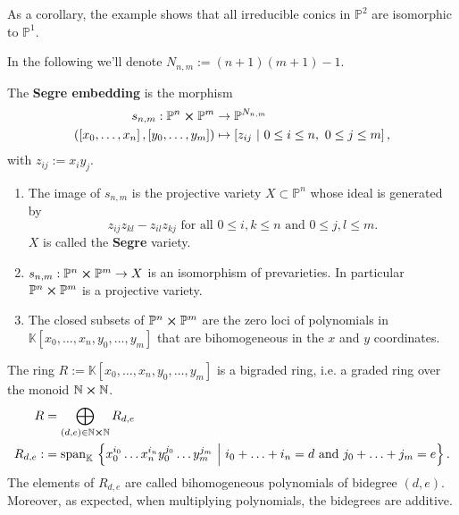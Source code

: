 \begin{rem}
	As a corollary, the example shows that all irreducible conics in $\mathbb{P}^{2}$ are isomorphic to $\mathbb{P}^{1}$.
\end{rem}

In the following we'll denote $N_{n,m} := \left( n + 1 \right) \left( m+1 \right) - 1$.
\begin{defn}
	The \textbf{Segre embedding} is the morphism
	\begin{align}
		s_{n,m}: \mathbb{P}^{n} \cross \mathbb{P}^{m} &\to \mathbb{P}^{N_{n,m}} \\
		\left( \left[ x_0 , \ldots , x_n \right], \left[ y_0 , \ldots , y_m \right] \right) &\mapsto 
		\left[ z_{ij} \ \middle|\ 0 \leq i \leq n,\ 0 \leq j \leq m \right]
	,\end{align} 
	with $z_{ij} := x_iy_j$.
\end{defn}

\begin{lem}\leavevmode\vspace{-.2\baselineskip}
	\begin{enumerate}
		\item The image of $s_{n,m}$ is the projective variety $X \subset \mathbb{P}^{n}$ whose
	ideal is generated by
	\begin{equation}
	z_{ij} z_{kl} - z_{il} z_{kj} \text{ for all } 0 \leq i,k \leq n \text{ and } 0 \leq j, l \leq m
	.\end{equation} 
	$X$ is called the \textbf{Segre} variety.
		\item $s_{n,m}: \mathbb{P}^{n} \cross \mathbb{P}^{m} \to X$ is an isomorphism of prevarieties.
			In particular $\mathbb{P}^{n} \cross \mathbb{P}^{m}$ is a projective variety.
		\item The closed subsets of $\mathbb{P}^{n} \cross \mathbb{P}^{m}$ are the zero loci of polynomials in
			$\mathbb{K}\left[x_0, \ldots, x_n, y_0, \ldots, y_m \right]$ that are bihomogeneous in the $x$ and $y$ coordinates.
	\end{enumerate}
\end{lem} 		

\begin{rem}
	The ring $R := \mathbb{K}\left[x_0, \ldots, x_n, y_0, \ldots, y_m \right]$ is a bigraded ring, i.e.
	a graded ring over the monoid $\mathbb{N} \cross \mathbb{N}$.
	\begin{align}
		R &= \bigoplus_{(d,e) \in \N \cross \N} R_{d,e}\\
		R_{d,e} :&= \mathrm{span}_{\K}\, \left\{ x_0^{i_0} \ldots x_n^{i_n} 
		y_0^{j_0} \ldots y_m^{j_m} \ \middle|\ 
		i_0 + \ldots + i_n = d \text{ and } j_0 + \ldots + j_m = e \right\}
	.\end{align} 
	The elements of $R_{d,e}$ are called bihomogeneous polynomials of bidegree $(d,e)$.
	Moreover, as expected, when multiplying polynomials, the bidegrees are additive.
\end{rem}

